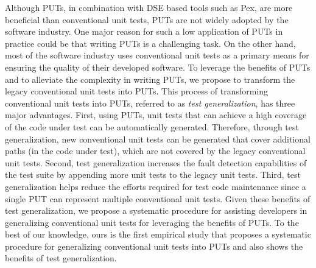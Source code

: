 Although PUTs, in combination with DSE based tools such as Pex, are more beneficial than conventional unit tests, PUTs are not widely adopted by the software industry. One major reason for such a low application of PUTs in practice could be that writing PUTs is a challenging task. On the other hand, most of the software industry uses conventional unit tests as a primary means for ensuring the quality of their developed software. To leverage the benefits of PUTs and to alleviate the complexity in writing PUTs, we propose to transform the legacy conventional unit tests into PUTs. This process of transforming conventional unit tests into PUTs, referred to as \emph{test generalization}, has three major advantages. First, using PUTs, unit tests that can achieve a high coverage of the code under test can be automatically generated. Therefore, through test generalization, new conventional unit tests can be generated that cover additional paths (in the code under test), which are not covered by the legacy conventional unit tests. Second, test generalization increases the fault detection capabilities of the test suite by appending more unit tests to the legacy unit tests. Third, test generalization helps reduce the efforts required for test code maintenance since a single PUT can represent multiple conventional unit tests. Given these benefits of test generalization, we propose a systematic procedure for assisting developers in generalizing conventional unit tests for leveraging the benefits of PUTs. To the best of our knowledge, ours is the first empirical study that proposes a systematic procedure for generalizing conventional unit tests into PUTs and also shows the benefits of test generalization. 

